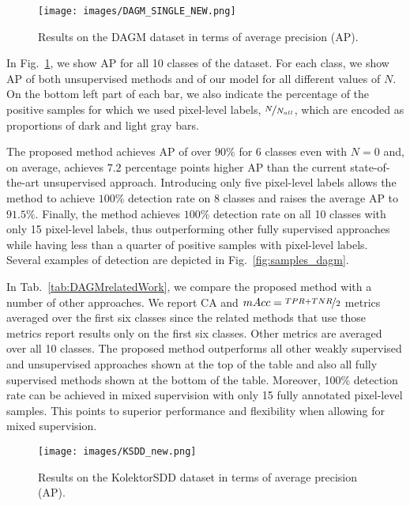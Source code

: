 \begin{figure}
    \centering
    \texttt{[image: images/DAGM\_SINGLE\_NEW.png]}
    \caption{Results on the DAGM dataset in terms of average precision (AP).} 
    \label{fig:dagm1}
\end{figure}

In Fig.~\ref{fig:dagm1}, we show  AP for all 10 classes of the dataset. 
For each class, we show AP of both unsupervised methods and of our model for all different values of $N$.
On the bottom left part of each bar, we also indicate the percentage of the positive samples for which we used pixel-level labels, $\nicefrac{N}{N_{all}}$, which are encoded as proportions of dark and light gray bars.

The proposed method achieves AP of over $90\%$ for 6 classes even with $N=0$ and, on average, achieves $7.2$ percentage points higher AP than the current state-of-the-art unsupervised approach.
Introducing only five pixel-level labels allows the method to achieve $100\%$ detection rate on 8 classes
and raises the average AP to $91.5\%$.
Finally, the method achieves $100\%$ detection rate on all 10 classes with only 15 pixel-level labels, thus outperforming other fully supervised approaches while having less than a quarter of positive samples with pixel-level labels. Several examples of detection are depicted in Fig.~\ref{fig:samples_dagm}.

In Tab.~\ref{tab:DAGMrelatedWork}, we compare the proposed method with a number of other approaches. We report CA and $mAcc=\nicefrac{TPR+TNR}{2}$ metrics averaged over the first six classes since the related methods that use those metrics report results only on the first six classes. Other metrics are averaged over all 10 classes. The proposed method outperforms all other weakly supervised and unsupervised approaches shown at the top of the table and also all fully supervised methods shown at the bottom of the table. Moreover, 100\% detection rate can be achieved in mixed supervision with only 15 fully annotated pixel-level samples. This points to superior performance and flexibility when allowing for mixed supervision.

\begin{figure}%
    \begin{center}
        \texttt{[image: images/KSDD\_new.png]}
    \end{center}
    \caption{Results on the KolektorSDD dataset in terms of average precision (AP).}
    \label{fig:ksdd}
\end{figure}

